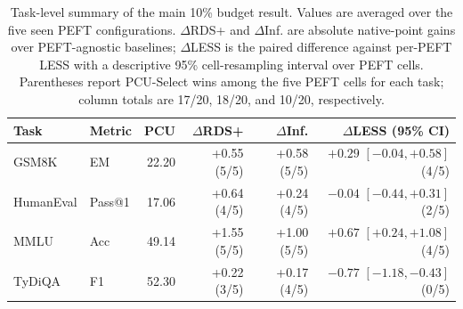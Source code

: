 \begin{table}[t]
\centering
\small
\setlength{\tabcolsep}{5pt}
\begin{tabular}{llrrrr}
\toprule
Task & Metric & PCU & $\Delta$RDS+ & $\Delta$Inf. & $\Delta$LESS (95\% CI) \\
\midrule
GSM8K & EM & 22.20 & +0.55 (5/5) & +0.58 (5/5) & $+0.29$ $[-0.04, +0.58]$ (4/5) \\
HumanEval & Pass@1 & 17.06 & +0.64 (4/5) & +0.24 (4/5) & $-0.04$ $[-0.44, +0.31]$ (2/5) \\
MMLU & Acc & 49.14 & +1.55 (5/5) & +1.00 (5/5) & $+0.67$ $[+0.24, +1.08]$ (4/5) \\
TyDiQA & F1 & 52.30 & +0.22 (3/5) & +0.17 (4/5) & $-0.77$ $[-1.18, -0.43]$ (0/5) \\
\bottomrule
\end{tabular}
\caption{Task-level summary of the main 10\% budget result. Values are averaged over the five seen PEFT configurations. $\Delta$RDS+ and $\Delta$Inf. are absolute native-point gains over PEFT-agnostic baselines; $\Delta$LESS is the paired difference against per-PEFT LESS with a descriptive 95\% cell-resampling interval over PEFT cells. Parentheses report PCU-Select wins among the five PEFT cells for each task; column totals are 17/20, 18/20, and 10/20, respectively.}
\label{tab:per-task-compact}
\end{table}
